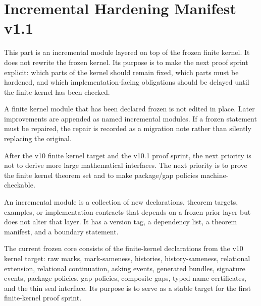 \chapter{Incremental Hardening Manifest v1.1}

This part is an incremental module layered on top of the frozen finite kernel. It does not rewrite the frozen kernel. Its purpose is to make the next proof sprint explicit: which parts of the kernel should remain fixed, which parts must be hardened, and which implementation-facing obligations should be delayed until the finite kernel has been checked.

\begin{principle}
A finite kernel module that has been declared frozen is not edited in place. Later improvements are appended as named incremental modules. If a frozen statement must be repaired, the repair is recorded as a migration note rather than silently replacing the original.
\end{principle}

\begin{principle}
After the v10 finite kernel target and the v10.1 proof sprint, the next priority is not to derive more large mathematical interfaces. The next priority is to prove the finite kernel theorem set and to make package/gap policies machine-checkable.
\end{principle}

\begin{definition}
An incremental module is a collection of new declarations, theorem targets, examples, or implementation contracts that depends on a frozen prior layer but does not alter that layer. It has a version tag, a dependency list, a theorem manifest, and a boundary statement.
\end{definition}

\begin{definition}
The current frozen core consists of the finite-kernel declarations from the v10 kernel target: raw marks, mark-sameness, histories, history-sameness, relational extension, relational continuation, asking events, generated bundles, signature events, package policies, gap policies, composite gaps, typed name certificates, and the thin seal interface. Its purpose is to serve as a stable target for the first finite-kernel proof sprint.
\end{definition}

